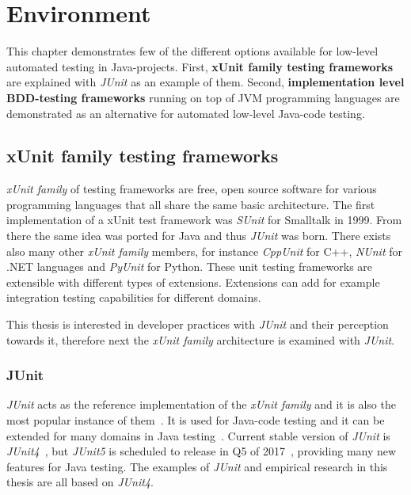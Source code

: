 \chapter{Environment}
\label{chapter:environment}
This chapter demonstrates few of the different options available for low-level automated testing in Java-projects. First,
\textbf{xUnit family testing frameworks} are explained with \textit{JUnit} as an example of them. Second, \textbf{implementation level BDD-testing frameworks}
running on top of JVM programming languages are demonstrated as an alternative for automated low-level Java-code testing.

\section{xUnit family testing frameworks} %
    \textit{xUnit family} of testing frameworks are free, open source software for various programming languages that
    all share the same basic architecture. The first implementation of a xUnit test framework was \textit{SUnit}
    for Smalltalk in 1999.  From there the same idea was ported for Java and thus \textit{JUnit} was born. There exists also many other
    \textit{xUnit family} members, for instance \textit{CppUnit} for C++, \textit{NUnit} for .NET languages and \textit{PyUnit} for Python.
    These unit testing frameworks are extensible with different types of extensions. Extensions can add for example integration testing capabilities
    for different domains. ~\cite{hamill2004unit}

    This thesis is interested in developer practices with \textit{JUnit} and their perception towards it, therefore next the \textit{xUnit family} architecture
    is examined with \textit{JUnit}.

    \subsection{JUnit}
    \textit{JUnit} acts as the reference implementation of the \textit{xUnit family} and it is also the most popular instance of them~\cite{hamill2004unit}.
    It is used for Java-code testing and it can be extended for many domains in Java testing~\cite{hamill2004unit}.
    Current stable version of \textit{JUnit} is \textit{JUnit4}~\cite{junit4}, but \textit{JUnit5} is scheduled to release in Q5 of 2017~\cite{junit5schedule},
    providing many new features for Java testing. The examples of \textit{JUnit} and empirical research in this thesis are all based on \textit{JUnit4}.

